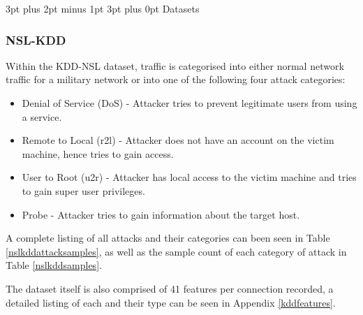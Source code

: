\documentclass[12pt,a4paper]{article}
\makeatletter
\renewcommand\subsection{\@startsection {subsection}{1}{2mm} %
      {3pt plus 2pt minus 1pt} %
      {3pt plus 0pt} %
      {\normalfont\bfseries}}
\makeatother
\begin{document}
\subsection{Datasets}
\subsubsection{NSL-KDD}
Within the KDD-NSL dataset, traffic is categorised into either normal network traffic for a military network or into one of the following four attack categories:
\begin{itemize}
\item{Denial of Service (DoS) - Attacker tries to prevent legitimate users from using a service.}
\item{Remote to Local (r2l) - Attacker does not have an account on the victim machine, hence tries to gain access.}
\item{User to Root (u2r) - Attacker has local access to the victim machine and tries to gain super user privileges.}
\item{Probe - Attacker tries to gain information about the target host.}
\end{itemize}
A complete listing of all attacks and their categories can been seen in Table \ref{nslkddattacksamples}, as well as the sample count of each category of attack in Table \ref{nslkddsamples}.



The dataset itself is also comprised of 41 features per connection recorded, a detailed listing of each and their type can be seen in Appendix \ref{kddfeatures}.
\end{document}
